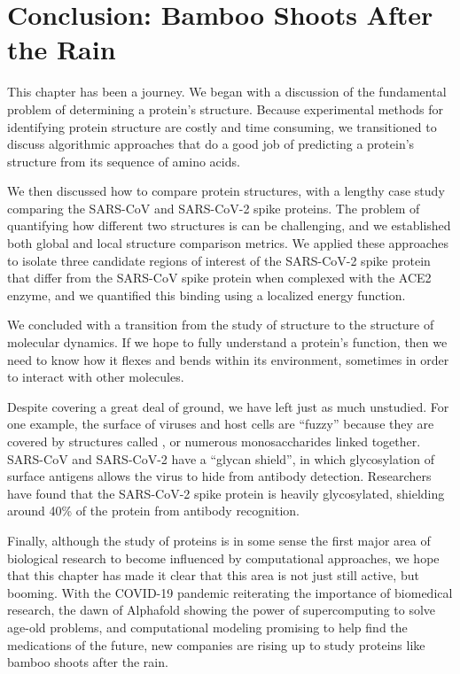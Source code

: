 \section{Conclusion: Bamboo Shoots After the Rain}

This chapter has been a journey. We began with a discussion of the fundamental problem of determining a protein's structure. Because experimental methods for identifying protein structure are costly and time consuming, we transitioned to discuss algorithmic approaches that do a good job of predicting a protein's structure from its sequence of amino acids.

We then discussed how to compare protein structures, with a lengthy case study comparing the SARS-CoV and SARS-CoV-2 spike proteins. The problem of quantifying how different two structures is can be challenging, and we established both global and local structure comparison metrics. We applied these approaches to isolate three candidate regions of interest of the SARS-CoV-2 spike protein that differ from the SARS-CoV spike protein when complexed with the ACE2 enzyme, and we quantified this binding using a localized energy function.

We concluded with a transition from the study of structure to the structure of molecular dynamics. If we hope to fully understand a protein's function, then we need to know how it flexes and bends within its environment, sometimes in order to interact with other molecules.

Despite covering a great deal of ground, we have left just as much unstudied. For one example, the surface of viruses and host cells are ``fuzzy'' because they are covered by structures called , or numerous monosaccharides linked together. SARS-CoV and SARS-CoV-2 have a “glycan shield”, in which glycosylation of surface antigens allows the virus to hide from antibody detection. Researchers have found that the SARS-CoV-2 spike protein is heavily glycosylated, shielding around 40\% of the protein from antibody recognition.

Finally, although the study of proteins is in some sense the first major area of biological research to become influenced by computational approaches, we hope that this chapter has made it clear that this area is not just still active, but booming. With the COVID-19 pandemic reiterating the importance of biomedical research, the dawn of Alphafold showing the power of supercomputing to solve age-old problems, and computational modeling promising to help find the medications of the future, new companies are rising up to study proteins like bamboo shoots after the rain.

